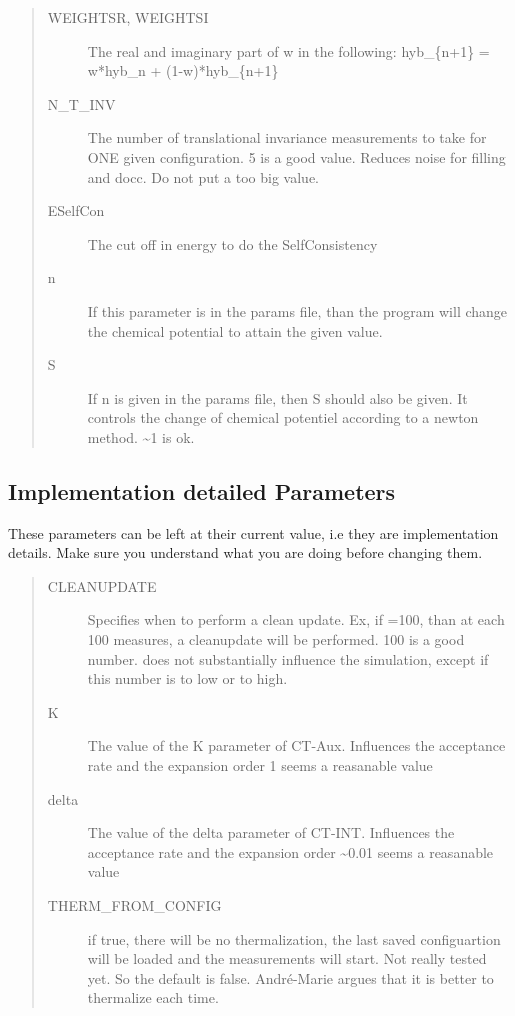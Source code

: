 \documentclass[letterpaper,10pt,english]{sphinxmanual}
\begin{document}
\begin{quote}
\begin{description}
\item[{WEIGHTSR, WEIGHTSI}] \leavevmode
The real and imaginary part of w in the following:
hyb\_\{n+1\} = w*hyb\_n + (1-w)*hyb\_\{n+1\}

\item[{N\_T\_INV}] \leavevmode
The number of translational invariance measurements to take for ONE given configuration. 5 is a good value. Reduces noise for filling and docc.
Do not put a too big value.

\item[{ESelfCon}] \leavevmode
The cut off in energy to do the SelfConsistency

\item[{n}] \leavevmode
If this parameter is in the params file, than the program will change the chemical potential to attain the given value.

\item[{S}] \leavevmode
If n is given in the params file, then S should also be given. It controls the change of chemical potentiel
according to a newton method. \textasciitilde{}1 is ok.

\end{description}
\end{quote}


\subsection{Implementation detailed Parameters}
\label{\detokenize{params:implementation-detailed-parameters}}
These parameters can be left at their current value, i.e they are implementation details.
Make sure you understand what you are doing before changing them.
\begin{quote}
\begin{description}
\item[{CLEANUPDATE}] \leavevmode
Specifies when to perform a clean update. Ex, if =100, than at each
100 measures, a cleanupdate will be performed. 100 is a good number.
does not substantially influence the simulation, except if this number is to low or to high.

\item[{K}] \leavevmode
The value of the K parameter of CT-Aux. Influences the acceptance rate and the expansion order
1 seems a reasanable value

\item[{delta}] \leavevmode
The value of the delta parameter of CT-INT. Influences the acceptance rate and the expansion order
\textasciitilde{}0.01 seems a reasanable value

\item[{THERM\_FROM\_CONFIG}] \leavevmode
if true, there will be no thermalization, the last saved configuartion will be loaded
and the measurements will start. Not really tested yet. So the default is false.
André-Marie argues that it is better to thermalize each time.

\end{description}
\end{quote}
\end{document}
